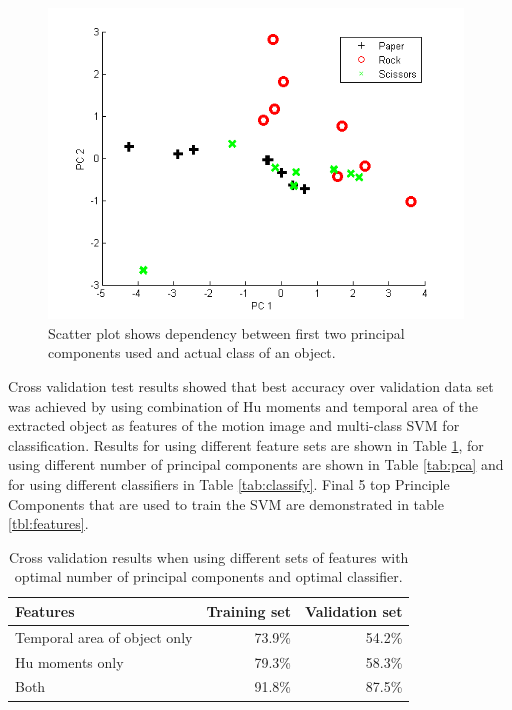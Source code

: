

\begin{figure}
\begin{center}
\includegraphics[width=110mm]{paclassplot.png}
\caption{Scatter plot shows dependency between first two principal components used and actual class of an object.}
\label{fig:paclassplot}
\end{center}
\end{figure}

Cross validation test results showed that best accuracy over validation data set was achieved by using combination of Hu moments and temporal area of the extracted object as features of the motion image and multi-class SVM for classification. Results for using different feature sets are shown in Table \ref{tab:features}, for using different number of principal components are shown in Table \ref{tab:pca} and for using different classifiers in Table \ref{tab:classify}. Final 5 top Principle Components that are used to train the SVM are demonstrated in table \ref{tbl:features}. 



\begin{table}
\begin{center}
\begin{tabular}{| l | r | r |}
\hline
Features & Training set & Validation set \\ \hline
Temporal area of object only & 73.9\% & 54.2\% \\
Hu moments only & 79.3\% & 58.3\% \\
Both & 91.8\% & 87.5\% \\
\hline
\end{tabular}
\end{center}
\caption{Cross validation results when using different sets of features with optimal number of principal components and optimal classifier.}
\label{tab:features}
\end{table}


